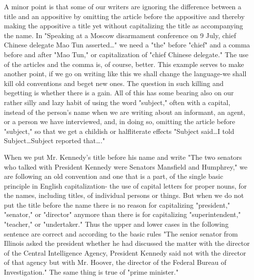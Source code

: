 \documentclass[
    oneside,
    11pt,
    draft
]{memoir}
\begin{document}
A minor point is that some of our writers are ignoring the difference between a title and an appositive by omitting the article before the appositive and thereby making the appositive a title yet without capitalizing the title as accompanying the name. In "Speaking at a Moscow disarmament conference on 9 July, chief Chinese delegate Mao Tun asserted\dots" we need a "the" before "chief" and a comma before and after "Mao Tun," or capitalization of "chief Chinese delegate." The use of the articles and the comma is, of course, better. This example serves to make another point, if we go on writing like this we shall change the language-we shall kill old conventions and beget new ones. The question in such killing and begetting is whether there is a gain. All of this has some bearing also on our rather silly and lazy habit of using the word "subject," often with a capital, instead of the person's name when we are writing about an informant, an agent, or a person we have interviewed, and, in doing so, omitting the article before "subject," so that we get a childish or halfliterate effects "Subject said\dots I told Subject\dots Subject reported that\dots." 

When we put Mr. Kennedy's title before his name and write "The two senators who talked with President Kennedy were Senators Mansfield and Humphrey," we are following an old convention and one that is a part, of the single basic principle in English capitalization- the use of capital letters for proper nouns, for the names, including titles, of individual persons or things. But when we do not put the title before the name there is no reason for capitalizing "president," "senator," or "director" anymore than there is for capitalizing "superintendent," "teacher," or "undertaker." Thus the upper and lower cases in the following sentence are correct and according to the basic rules "The senior senator from Illinois asked the president whether he had discussed the matter with the director of the Central Intelligence Agency, President Kennedy said not with the director of that agency but with Mr. Hoover, the director of the Federal Bureau of Investigation." The same thing is true of "prime minister." 
\end{document}
